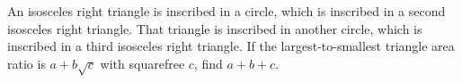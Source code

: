 An isosceles right triangle is inscribed in a circle, which is inscribed in a second isosceles right triangle. That triangle is inscribed in another circle, which is inscribed in a third isosceles right triangle. If the largest-to-smallest triangle area ratio is $a+b\sqrt c$ with squarefree $c$, find $a+b+c$.
